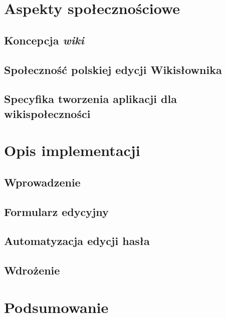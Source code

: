 \documentclass{pracamgr}
\begin{document}

\chapter{Aspekty społecznościowe}
\section{Koncepcja \emph{wiki}}
\section{Społeczność polskiej edycji Wikisłownika}
\label{sec:plsoc}

\section{Specyfika tworzenia aplikacji dla wikispołeczności}

\chapter{Opis implementacji}
\label{chap:impl}
\section{Wprowadzenie}
\section{Formularz edycyjny}
\section{Automatyzacja edycji hasła}
\section{Wdrożenie}

\chapter{Podsumowanie}


\end{document}
